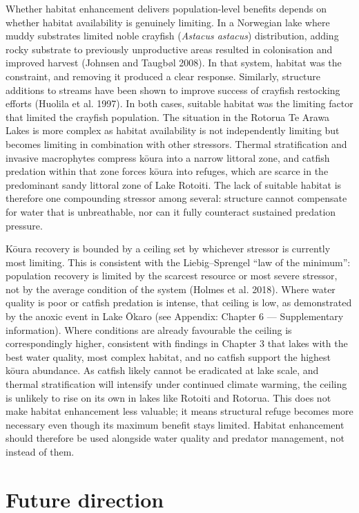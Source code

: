 \documentclass[
  12pt,
  a4paper,
  oneside]{scrbook}
\begin{document}
Whether habitat enhancement delivers population-level benefits depends
on whether habitat availability is genuinely limiting. In a Norwegian
lake where muddy substrates limited noble crayfish (\emph{Astacus
astacus}) distribution, adding rocky substrate to previously
unproductive areas resulted in colonisation and improved harvest
(Johnsen and Taugbøl 2008). In that system, habitat was the constraint,
and removing it produced a clear response. Similarly, structure
additions to streams have been shown to improve success of crayfish
restocking efforts (Huolila et al. 1997). In both cases, suitable
habitat was the limiting factor that limited the crayfish population.
The situation in the Rotorua Te Arawa Lakes is more complex as habitat
availability is not independently limiting but becomes limiting in
combination with other stressors. Thermal stratification and invasive
macrophytes compress kōura into a narrow littoral zone, and catfish
predation within that zone forces kōura into refuges, which are scarce
in the predominant sandy littoral zone of Lake Rotoiti. The lack of
suitable habitat is therefore one compounding stressor among several:
structure cannot compensate for water that is unbreathable, nor can it
fully counteract sustained predation pressure.

Kōura recovery is bounded by a ceiling set by whichever stressor is
currently most limiting. This is consistent with the Liebig--Sprengel
``law of the minimum'': population recovery is limited by the scarcest
resource or most severe stressor, not by the average condition of the
system (Holmes et al. 2018). Where water quality is poor or catfish
predation is intense, that ceiling is low, as demonstrated by the anoxic
event in Lake Ōkaro (see Appendix: Chapter 6 --- Supplementary
information). Where conditions are already favourable the ceiling is
correspondingly higher, consistent with findings in Chapter 3 that lakes
with the best water quality, most complex habitat, and no catfish
support the highest kōura abundance. As catfish likely cannot be
eradicated at lake scale, and thermal stratification will intensify
under continued climate warming, the ceiling is unlikely to rise on its
own in lakes like Rotoiti and Rotorua. This does not make habitat
enhancement less valuable; it means structural refuge becomes more
necessary even though its maximum benefit stays limited. Habitat
enhancement should therefore be used alongside water quality and
predator management, not instead of them.

\section{Future direction}\label{future-direction}
\end{document}
